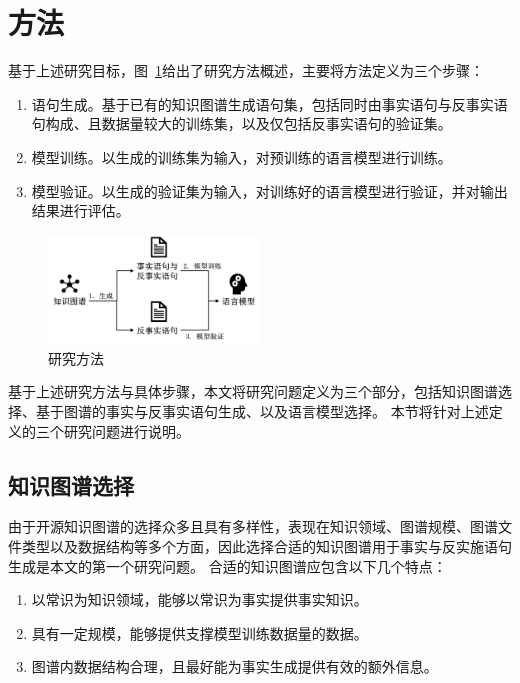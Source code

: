 \section{方法}
基于上述研究目标，图~\ref{fig:研究方法}给出了研究方法概述，主要将方法定义为三个步骤：

\begin{enumerate}
    \item 语句生成。基于已有的知识图谱生成语句集，包括同时由事实语句与反事实语句构成、且数据量较大的训练集，以及仅包括反事实语句的验证集。
    \item 模型训练。以生成的训练集为输入，对预训练的语言模型进行训练。
    \item 模型验证。以生成的验证集为输入，对训练好的语言模型进行验证，并对输出结果进行评估。
\end{enumerate}

\begin{figure}[htb]
    \centering
    \includegraphics[width=0.5\textwidth]{images/研究方法.png}
    \caption[研究方法]{研究方法}
    \label{fig:研究方法}
\end{figure}

基于上述研究方法与具体步骤，本文将研究问题定义为三个部分，包括知识图谱选择、基于图谱的事实与反事实语句生成、以及语言模型选择。
本节将针对上述定义的三个研究问题进行说明。

\subsection{知识图谱选择}
\label{subsection:kg-selection}

由于开源知识图谱的选择众多且具有多样性，表现在知识领域、图谱规模、图谱文件类型以及数据结构等多个方面，因此选择合适的知识图谱用于事实与反实施语句生成是本文的第一个研究问题。
合适的知识图谱应包含以下几个特点：
\begin{enumerate}
    \item 以常识为知识领域，能够以常识为事实提供事实知识。
    \item 具有一定规模，能够提供支撑模型训练数据量的数据。
    \item 图谱内数据结构合理，且最好能为事实生成提供有效的额外信息。
\end{enumerate}

